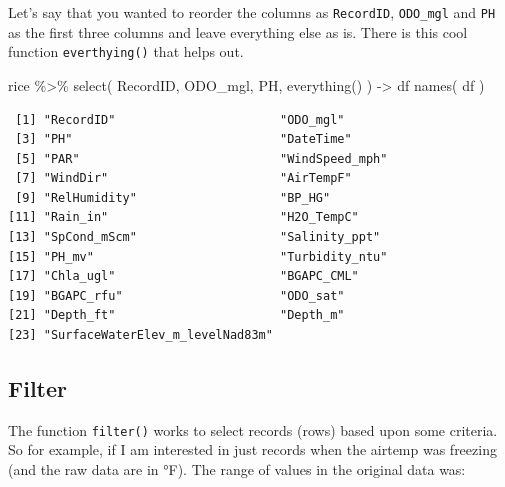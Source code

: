 \documentclass[
  letterpaper,
]{book}
\newenvironment{Shaded}{\begin{snugshade}}{\end{snugshade}}
\newcommand{\FunctionTok}[1]{\textcolor[rgb]{0.28,0.35,0.67}{#1}}
\newcommand{\NormalTok}[1]{\textcolor[rgb]{0.00,0.23,0.31}{#1}}
\newcommand{\OtherTok}[1]{\textcolor[rgb]{0.00,0.23,0.31}{#1}}
\newcommand{\SpecialCharTok}[1]{\textcolor[rgb]{0.37,0.37,0.37}{#1}}
\begin{document}
Let's say that you wanted to reorder the columns as \texttt{RecordID},
\texttt{ODO\_mgl} and \texttt{PH} as the first three columns and leave
everything else as is. There is this cool function \texttt{everthying()}
that helps out.

\begin{Shaded}
\begin{Highlighting}[]
\NormalTok{rice }\SpecialCharTok{\%\textgreater{}\%}
  \FunctionTok{select}\NormalTok{( RecordID, ODO\_mgl, PH, }\FunctionTok{everything}\NormalTok{() ) }\OtherTok{{-}\textgreater{}}\NormalTok{ df}
\FunctionTok{names}\NormalTok{( df )}
\end{Highlighting}
\end{Shaded}

\begin{verbatim}
 [1] "RecordID"                       "ODO_mgl"                       
 [3] "PH"                             "DateTime"                      
 [5] "PAR"                            "WindSpeed_mph"                 
 [7] "WindDir"                        "AirTempF"                      
 [9] "RelHumidity"                    "BP_HG"                         
[11] "Rain_in"                        "H2O_TempC"                     
[13] "SpCond_mScm"                    "Salinity_ppt"                  
[15] "PH_mv"                          "Turbidity_ntu"                 
[17] "Chla_ugl"                       "BGAPC_CML"                     
[19] "BGAPC_rfu"                      "ODO_sat"                       
[21] "Depth_ft"                       "Depth_m"                       
[23] "SurfaceWaterElev_m_levelNad83m"
\end{verbatim}

\subsection{Filter}\label{filter}

The function \texttt{filter()} works to select records (rows) based upon
some criteria. So for example, if I am interested in just records when
the airtemp was freezing (and the raw data are in °F). The range of
values in the original data was:

\begin{Shaded}
\end{Shaded}
\end{document}
